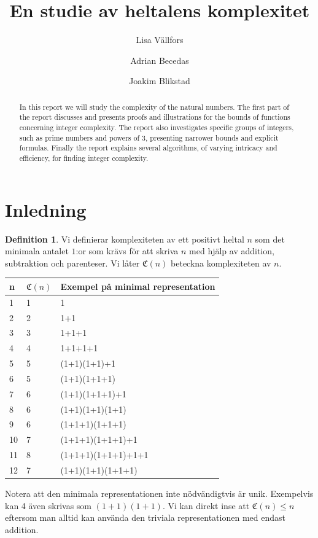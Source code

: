 \documentclass[a4paper,titlepage]{article}
\title{En studie av heltalens komplexitet}
\author{Lisa Vällfors \and Adrian Becedas \and Joakim Blikstad}
\newcommand{\C}[1]{\mathfrak C \left( #1 \right)}
\theoremstyle{definition}
\newtheorem{definition}{Definition}
\begin{document}
\maketitle
{}
\begin{abstract}
    In this report we will study the complexity of the natural numbers. 
    The first part of the report discusses and presents proofs and illustrations for the bounds of functions
    concerning integer complexity.
    The report also investigates specific groups of integers, such as prime numbers and
    powers of 3, presenting narrower bounds and explicit formulas.
    Finally the report explains several algorithms, of varying intricacy and efficiency, for finding integer
    complexity.
    
\end{abstract}

\tableofcontents 
\newpage

\section{Inledning}
    
    \begin{definition}
       Vi definierar komplexiteten av ett positivt heltal $n$ som det minimala
       antalet $1$:or som krävs för att skriva $n$ med hjälp av addition,
       subtraktion och parenteser. Vi låter $\C{n}$ beteckna komplexiteten av
       $n$. 
    \end{definition}
    \begin{center}
 \begin{tabular}{| l | l | l | }
    \hline
    n & $\C{n}$ & Exempel på minimal representation  \\ \hline
    1 & 1 & 1  \\ \hline
    2 & 2 & 1+1  \\ \hline
    3 & 3 & 1+1+1  \\ \hline
    4 & 4 & 1+1+1+1  \\ \hline
    5 & 5 & (1+1)(1+1)+1  \\ \hline
    6 & 5 & (1+1)(1+1+1)  \\ \hline
    7 & 6 & (1+1)(1+1+1)+1  \\ \hline
    8 & 6 & (1+1)(1+1)(1+1)  \\ \hline
    9 & 6 & (1+1+1)(1+1+1)  \\ \hline
    10 & 7 & (1+1+1)(1+1+1)+1  \\ \hline
    11 & 8 & (1+1+1)(1+1+1)+1+1  \\ \hline
    12 & 7 & (1+1)(1+1)(1+1+1)  \\
    \hline
    \end{tabular}
\end{center}
    Notera att den minimala representationen inte nödvändigtvis är unik.
    Exempelvis kan 4 även skrivas som $(1+1)(1+1)$. Vi kan direkt inse att $\C{n} \le n$
    eftersom man alltid kan använda den triviala representationen med endast addition.
\end{document}
